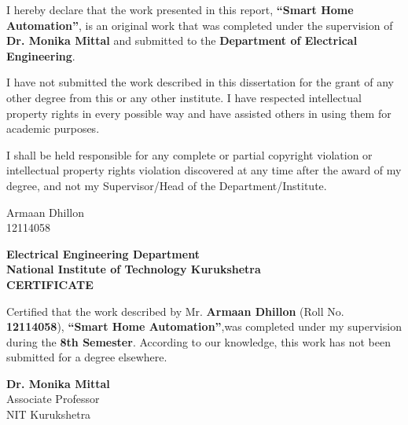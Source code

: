 \documentclass[a4paper,12pt]{report}
\begin{document}
\vspace{0.5cm}

I hereby declare that the work presented in this report,  
\textbf{“Smart Home Automation”}, is an original work that was completed under the supervision of \textbf{Dr. Monika Mittal} and submitted to the  
\textbf{Department of Electrical Engineering}. 

I have not submitted the work described in this dissertation for the grant of any other degree from this or any other institute. I have respected intellectual property rights in every possible way and have assisted others in using them for academic purposes.  

I shall be held responsible for any complete or partial copyright violation or intellectual property rights violation discovered at any time after the award of my degree, and not my Supervisor/Head of the Department/Institute.

\vspace{2cm}

\noindent
\begin{flushright}
Armaan Dhillon  \hspace{3cm} \\ 
12114058  \hspace{3cm} \\ 
\end{flushright}

\newpage

\begin{center}
    \textbf{Electrical Engineering Department}\\
    \textbf{National Institute of Technology Kurukshetra}\\[1cm]
    
    \textbf{\Large CERTIFICATE}\\
    \hrulefill
\end{center}

\vspace{0.5cm}

Certified that the work described by Mr. \textbf{Armaan Dhillon} (Roll No. \textbf{12114058}), \textbf{“Smart Home Automation”},was completed under my supervision during the \textbf{8th Semester}. According to our knowledge, this work has not been submitted for a degree elsewhere.

\vspace{6cm}

\begin{flushright}
\textbf{Dr. Monika Mittal}\\
Associate Professor\\
NIT Kurukshetra
\end{flushright}
\end{document}
